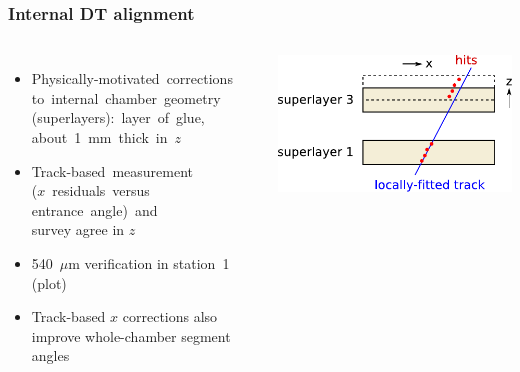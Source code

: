 \documentclass[compress]{beamer}
\begin{document}
\begin{frame}
\frametitle{Internal DT alignment}

\begin{columns}
\begin{itemize}\setlength{\itemsep}{0.25 cm}
\item \mbox{Physically-motivated corrections\hspace{-3 cm}} \\ \mbox{to internal chamber geometry\hspace{-3 cm}} \\ \mbox{(superlayers): layer of glue,\hspace{-3 cm}} \\ \mbox{about 1~mm thick in $z$\hspace{-3 cm}}

\item \mbox{Track-based measurement\hspace{-3 cm}} \\ \mbox{($x$ residuals versus\hspace{-3 cm}} \\ \mbox{entrance angle) and\hspace{-3 cm}} \\ survey agree in $z$

\item 540~$\mu$m verification in station~1 (plot)

\item Track-based $x$ corrections also improve whole-chamber segment angles
\end{itemize}

\hfill \includegraphics[width=0.7\linewidth]{internal_dt.pdf}


\end{columns}
\end{frame}
\end{document}
